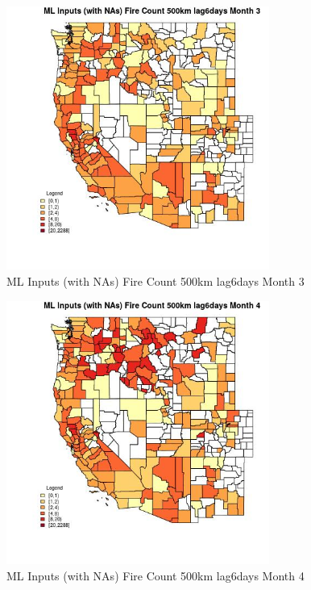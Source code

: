 \begin{figure} 
\centering  
\includegraphics[width=0.77\textwidth]{Code_Outputs/Report_ML_input_PM25_Step4_part_e_de_duplicated_aves_compiled_2019-05-20wNAs_CountyFire_Count_500km_lag6daysmedianMonth3.jpg} 
\caption{\label{fig:Report_ML_input_PM25_Step4_part_e_de_duplicated_aves_compiled_2019-05-20wNAsCountyFire_Count_500km_lag6daysmedianMonth3}ML Inputs (with NAs) Fire Count 500km lag6days Month 3} 
\end{figure} 
 

\begin{figure} 
\centering  
\includegraphics[width=0.77\textwidth]{Code_Outputs/Report_ML_input_PM25_Step4_part_e_de_duplicated_aves_compiled_2019-05-20wNAs_CountyFire_Count_500km_lag6daysmedianMonth4.jpg} 
\caption{\label{fig:Report_ML_input_PM25_Step4_part_e_de_duplicated_aves_compiled_2019-05-20wNAsCountyFire_Count_500km_lag6daysmedianMonth4}ML Inputs (with NAs) Fire Count 500km lag6days Month 4} 
\end{figure} 
 

